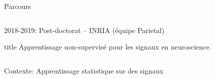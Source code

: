 \documentclass{beamer}
\def\myitem{\hskip1em{\color{linkcolor} $\blacktriangleright$}\hskip.3em}
\begin{document}
\begin{frame}[t]{Parcours}
\begin{columns}[c]
\begin{list}{}{\leftmargin=0em \itemsep=1em}
\begin{columns}[T]
        \end{columns}
        
        \item 2018-2019: Post-doctorat -- INRIA (équipe Parietal)
        \begin{beamercolorbox}[rounded=true, shadow=true]{title}
            Apprentissage non-supervisé pour les signaux en neuroscience.\\
        \end{beamercolorbox}
    \end{list}
\end{columns}

\end{frame}


\begin{frame}[t]{Contexte: Apprentissage statistique sur des signaux}
\centering
{}

\end{frame}
\end{document}
